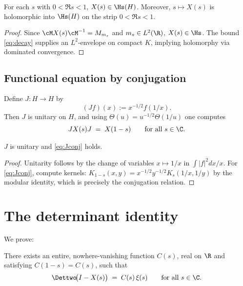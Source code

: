 \begin{corollary}\label{cor:HSHol}
For each \(s\) with \(0<\Re s<1\), \(X(s)\in \Hs(H)\). Moreover, \(s\mapsto X(s)\) is holomorphic into \(\Hs(H)\) on the strip \(0<\Re s<1\).
\end{corollary}

\begin{proof}
Since \(\cM X(s)\cM^{-1}=M_{m_s}\) and \(m_s\in L^2(\R)\), \(X(s)\in\Hs\). The bound \eqref{eq:decay} supplies an \(L^2\)-envelope on compact \(K\), implying holomorphy via dominated convergence.
\end{proof}

\subsection{Functional equation by conjugation}
Define \(J:H\to H\) by
\begin{equation}\label{eq:J}
(Jf)(x):=x^{-1/2} f(1/x).
\end{equation}
Then \(J\) is unitary on \(H\), and using \(\Theta(u)=u^{-1/2}\Theta(1/u)\) one computes
\begin{equation}\label{eq:Jconj}
J X(s) J \;=\; X(1-s)\qquad \text{for all } s\in\C.
\end{equation}

\begin{lemma}\label{lem:Junitary}
\(J\) is unitary and \eqref{eq:Jconj} holds.
\end{lemma}

\begin{proof}
Unitarity follows by the change of variables \(x\mapsto 1/x\) in \(\int |f|^2 dx/x\). For \eqref{eq:Jconj}, compute kernels:
\(
K_{1-s}(x,y)
=x^{-1/2}y^{-1/2} K_s(1/x,1/y)
\)
by the modular identity, which is precisely the conjugation relation.
\end{proof}

\section{The determinant identity}\label{sec:DetIdentity}

We prove:
\begin{theorem}\label{thm:Main}
There exists an entire, nowhere-vanishing function \(C(s)\), real on \(\R\) and satisfying \(C(1-s)=C(s)\), such that
\begin{equation}\label{eq:MainIdentity}
\Dettwo\!\big(I-X(s)\big) \;=\; C(s)\,\xi(s)\qquad \text{for all } s\in\C.
\end{equation}
\end{theorem}

